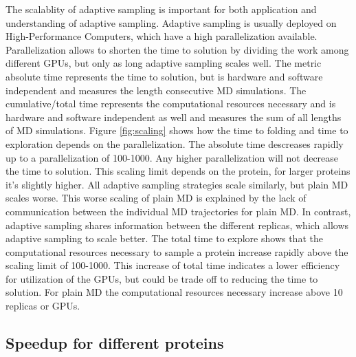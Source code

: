 The scalablity of adaptive sampling is important for both application and understanding of adaptive sampling.  Adaptive sampling is usually deployed on High-Performance Computers, which have a high parallelization available. Parallelization allows to shorten the time to solution by dividing the work among different GPUs, but only as long adaptive sampling scales well.
The metric absolute time represents the time to solution, but is hardware and software independent and measures the length consecutive MD simulations. The cumulative/total time represents the computational resources necessary and is hardware and software independent as well and measures the sum of all lengths of MD simulations.
Figure \ref{fig:scaling} shows how the time to folding and time to exploration depends on the parallelization. The absolute time descreases rapidly up to a parallelization of 100-1000. Any higher parallelization will not decrease the time to solution. This scaling limit depends on the protein, for larger proteins it's slightly higher. All adaptive sampling strategies scale similarly, but plain MD scales worse. This worse scaling of plain MD is explained by the lack of communication between the individual MD trajectories for plain MD. In contrast, adaptive sampling shares information between the different replicas, which allows adaptive sampling to scale better. The total time to explore shows that the computational resources necessary to sample a protein increase rapidly above the scaling limit of 100-1000. This increase of total time indicates a lower efficiency for utilization of the GPUs, but could be trade off to reducing the time to solution. For plain MD the computational resources necessary increase above 10 replicas or GPUs.



\subsection{\label{sec:compare}Speedup for different proteins}


